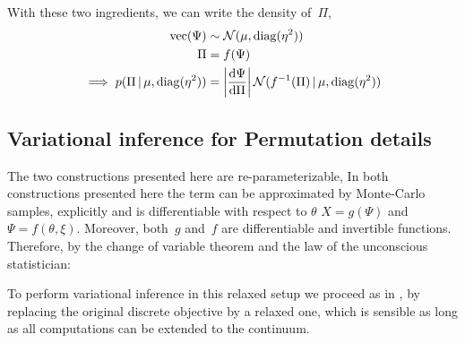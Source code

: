 \documentclass[twoside]{article}
\begin{document}
With these two ingredients, we can write the density of~${\Pi}$,
\begin{align}
  \text{vec} (\Psi) &\sim \mathcal{N}(\mu, \operatorname{diag}(\eta^2))
  \\
  {\Pi} &= f(\Psi) \\
  \implies
  p(\Pi \, | \, \mu, \operatorname{diag}(\eta^2)) &= \left|\frac{\mathrm{d} \Psi }{\mathrm{d} {\Pi}} \right|
  \mathcal{N}(f^{-1}({\Pi}) \, | \, \mu, \operatorname{diag}(\eta^2))
\end{align}

\subsection*{Variational inference for Permutation details}

The two constructions presented here are re-parameterizable, In both constructions presented here 
the term  can be approximated by Monte-Carlo samples, explicitly and is differentiable with respect to $\theta$
${X = g(\Psi)}$ and~${\Psi = f(\theta,
  \xi)}$. Moreover, both~$g$ and~$f$ are differentiable and invertible
functions. Therefore, by the change of variable theorem and the law of
the unconscious statistician:




To perform variational inference in this relaxed setup we proceed as in \cite{maddison2016concrete}, by replacing the original discrete objective by a relaxed one, which is sensible as long as all computations can be extended to the continuum. 
\label{sub:protocol}
\end{document}
